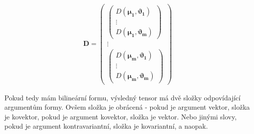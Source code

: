 \documentclass[a5paper,12pt]{amsbook}
\theoremstyle{definition}
\newcommand{\myvec}[1]{\bm{#1}}
\newcommand{\mymatrix}[1]{\mathbf{#1}}
\begin{document}
\begin{equation*}
\begin{split}
\mymatrix{D} = 
\left(\begin{array}{c}
  \left(\begin{array}{c}
    D(\myvec{\mu_1}, \myvec{\vartheta_1}) \\
    \vdots \\
    D(\myvec{\mu_1}, \myvec{\vartheta_m})
  \end{array}\right) \\
  \vdots \\
  \left(\begin{array}{c}
    D(\myvec{\mu_m}, \myvec{\vartheta_1}) \\
    \vdots \\
    D(\myvec{\mu_m}, \myvec{\vartheta_m})
  \end{array}\right)
\end{array}\right)
\end{split}
\end{equation*}

Pokud tedy mám bilineární formu, výsledný tensor má dvě složky odpovídající argumentům formy. Ovšem
složka je obrácená - pokud je argument vektor, složka je kovektor, pokud je argument kovektor,
složka je vektor. Nebo jinými slovy, pokud je argument kontravariantní, složka je kovariantní,
a naopak.
\end{document}
